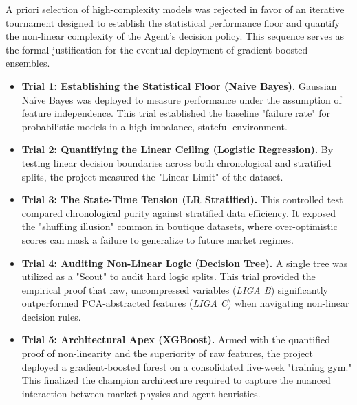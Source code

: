 A priori selection of high-complexity models was rejected in favor of an iterative tournament designed to establish the statistical performance floor and quantify the non-linear complexity of the Agent’s decision policy. This sequence serves as the formal justification for the eventual deployment of gradient-boosted ensembles.

\begin{itemize}[leftmargin=0.5cm, labelsep=0.3cm]
    \item \textbf{Trial 1: Establishing the Statistical Floor (Naive Bayes).} Gaussian Naïve Bayes was deployed to measure performance under the assumption of feature independence. This trial established the baseline "failure rate" for probabilistic models in a high-imbalance, stateful environment.
    
    \item \textbf{Trial 2: Quantifying the Linear Ceiling (Logistic Regression).} By testing linear decision boundaries across both chronological and stratified splits, the project measured the "Linear Limit" of the dataset. 
    
    \item \textbf{Trial 3: The State-Time Tension (LR Stratified).} This controlled test compared chronological purity against stratified data efficiency. It exposed the "shuffling illusion" common in boutique datasets, where over-optimistic scores can mask a failure to generalize to future market regimes.
    
    \item \textbf{Trial 4: Auditing Non-Linear Logic (Decision Tree).} A single tree was utilized as a "Scout" to audit hard logic splits. This trial provided the empirical proof that raw, uncompressed variables (\textit{LIGA B}) significantly outperformed PCA-abstracted features (\textit{LIGA C}) when navigating non-linear decision rules.
    
    \item \textbf{Trial 5: Architectural Apex (XGBoost).} Armed with the quantified proof of non-linearity and the superiority of raw features, the project deployed a gradient-boosted forest on a consolidated five-week "training gym." This finalized the champion architecture required to capture the nuanced interaction between market physics and agent heuristics.
\end{itemize}

